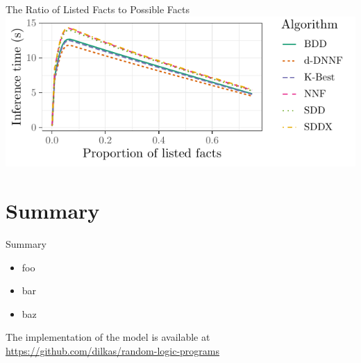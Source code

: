 \documentclass{beamer}
\begin{document}
\begin{frame}{The Ratio of Listed Facts to Possible Facts}
  \includegraphics{proportion.pdf}
\end{frame}

\section{Summary}

\begin{frame}{Summary}
  \begin{itemize}
  \item foo
  \item bar
  \item baz
  \end{itemize}
  \begin{block}{The implementation of the model is available at}
    \url{https://github.com/dilkas/random-logic-programs}
  \end{block}
\end{frame}

\end{document}
